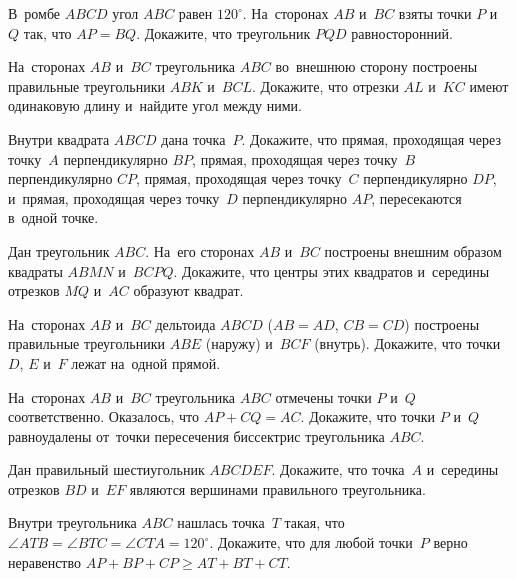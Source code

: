 


\begin{problems}

\item
В~ромбе $ABCD$ угол $ABC$ равен $120^{\circ}$.
На~сторонах $AB$ и~$BC$ взяты точки $P$ и~$Q$ так, что $AP = BQ$.
Докажите, что треугольник $PQD$ равносторонний.

\item
На~сторонах $AB$ и~$BC$ треугольника $ABC$ во~внешнюю сторону построены
правильные треугольники $ABK$ и~$BCL$.
Докажите, что отрезки $AL$ и~$KC$ имеют одинаковую длину и~найдите угол между
ними.

\item
Внутри квадрата $ABCD$ дана точка~$P$.
Докажите, что прямая, проходящая через точку~$A$ перпендикулярно $BP$, прямая,
проходящая через точку~$B$ перпендикулярно $CP$, прямая, проходящая через
точку~$C$ перпендикулярно $DP$, и~прямая, проходящая через точку~$D$
перпендикулярно $AP$, пересекаются в~одной точке.

\item
Дан треугольник $ABC$.
На~его сторонах $AB$ и~$BC$ построены внешним образом квадраты $ABMN$ и~$BCPQ$.
Докажите, что центры этих квадратов и~середины отрезков $MQ$ и~$AC$ образуют
квадрат.

\item
На~сторонах $AB$ и~$BC$ дельтоида $ABCD$ ($AB = AD$, $CB = CD$) построены
правильные треугольники $ABE$ (наружу) и~$BCF$ (внутрь).
Докажите, что точки $D$, $E$ и~$F$ лежат на~одной прямой.

\item
На~сторонах $AB$ и~$BC$ треугольника $ABC$ отмечены точки $P$ и~$Q$
соответственно.
Оказалось, что $AP + CQ = AC$.
Докажите, что точки $P$ и~$Q$ равноудалены от~точки пересечения биссектрис
треугольника $ABC$.

\item
Дан правильный шестиугольник $ABCDEF$.
Докажите, что точка~$A$ и~середины отрезков $BD$ и~$EF$ являются вершинами
правильного треугольника.

\item
Внутри треугольника $ABC$ нашлась точка~$T$ такая, что
\( \angle ATB = \angle BTC = \angle CTA = 120^{\circ} \).
Докажите, что для любой точки~$P$ верно неравенство
\( AP + BP + CP \geq AT + BT + CT \).


\end{problems}
